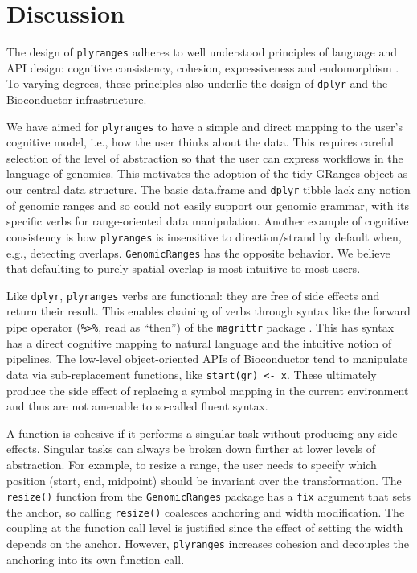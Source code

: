 \documentclass[]{article}
\begin{document}
\hypertarget{discussion}{%
\section{Discussion}\label{discussion}}

The design of \texttt{plyranges} adheres to well understood principles
of language and API design: cognitive consistency, cohesion,
expressiveness and endomorphism \cite{Green1996-qg}. To varying degrees,
these principles also underlie the design of \texttt{dplyr} and the
Bioconductor infrastructure.

We have aimed for \texttt{plyranges} to have a simple and direct mapping
to the user's cognitive model, i.e., how the user thinks about the data.
This requires careful selection of the level of abstraction so that the
user can express workflows in the language of genomics. This motivates
the adoption of the tidy GRanges object as our central data structure.
The basic data.frame and \texttt{dplyr} tibble lack any notion of
genomic ranges and so could not easily support our genomic grammar, with
its specific verbs for range-oriented data manipulation. Another example
of cognitive consistency is how \texttt{plyranges} is insensitive to
direction/strand by default when, e.g., detecting overlaps.
\texttt{GenomicRanges} has the opposite behavior. We believe that
defaulting to purely spatial overlap is most intuitive to most users.

Like \texttt{dplyr}, \texttt{plyranges} verbs are functional: they are
free of side effects and return their result. This enables chaining of
verbs through syntax like the forward pipe operator
(\texttt{\%\textgreater{}\%}, read as ``then'') of the \texttt{magrittr}
package \cite{R-magrittr}. This has syntax has a direct cognitive
mapping to natural language and the intuitive notion of pipelines. The
low-level object-oriented APIs of Bioconductor tend to manipulate data
via sub-replacement functions, like \texttt{start(gr)\ \textless{}-\ x}.
These ultimately produce the side effect of replacing a symbol mapping
in the current environment and thus are not amenable to so-called fluent
syntax.

A function is cohesive if it performs a singular task without producing
any side-effects. Singular tasks can always be broken down further at
lower levels of abstraction. For example, to resize a range, the user
needs to specify which position (start, end, midpoint) should be
invariant over the transformation. The \texttt{resize()} function from
the \texttt{GenomicRanges} package has a \texttt{fix} argument that sets
the anchor, so calling \texttt{resize()} coalesces anchoring and width
modification. The coupling at the function call level is justified since
the effect of setting the width depends on the anchor. However,
\texttt{plyranges} increases cohesion and decouples the anchoring into
its own function call.
\end{document}
